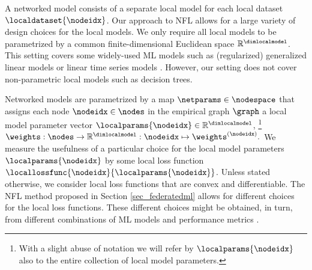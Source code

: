 \documentclass[lettersize,journal]{IEEEtran}
\begin{document}
A networked model consists of a separate local model for each local dataset $\localdataset{\nodeidx}$. 
Our approach to NFL allows for a large variety of design choices for the local models. We only 
require all local models to be parametrized by a common finite-dimensional Euclidean space $\mathbb{R}^{\dimlocalmodel}$. 
This setting covers some widely-used ML models such as (regularized) generalized linear 
models or linear time series models \cite{LocalizedLinReg2019,Brockwell91}. 
However, our setting does not cover non-parametric local models such as decision trees. 

Networked models are parametrized by a map $\netparams \in \nodespace$ that assigns each node $\nodeidx \in \nodes$ 
in the empirical graph $\graph$ a local model parameter vector $\localparams{\nodeidx} \in \mathbb{R}^{\dimlocalmodel}$, \footnote{With 
	a slight abuse of notation we will refer by $\localparams{\nodeidx}$ also to the entire collection of local model parameters.}
$\weights: \nodes \rightarrow \mathbb{R}^{\dimlocalmodel}: \nodeidx \mapsto \weights^{(\nodeidx)}.$
%
We measure the usefulness of a particular choice for the local model parameters $\localparams{\nodeidx}$ 
by some local loss function $\locallossfunc{\nodeidx} {\localparams{\nodeidx}}$. Unless stated otherwise, 
we consider local loss functions that are convex and differentiable. The NFL method proposed in 
Section \ref{sec_federatedml} allows for different choices for the local loss functions. These different choices 
might be obtained, in turn, from different combinations of ML models and performance metrics \cite[Ch. 3]{MLBasics}. 
\end{document}
